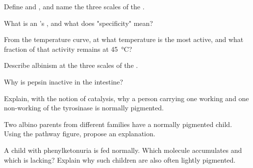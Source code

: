 \begin{exercise}[$\star$]\label{exo:g11:enzymes-and-phenotype:1}
Define  and , and name the three scales of the
.
\end{exercise}

\begin{exercise}[$\star$]\label{exo:g11:enzymes-and-phenotype:2}
What is an 's , and what does "specificity" mean?
\end{exercise}

\begin{exercise}[$\star$]\label{exo:g11:enzymes-and-phenotype:3}
From the temperature curve, at what temperature is the  most
active, and what fraction of that activity remains at
\qty{45}{\celsius}?
\end{exercise}

\begin{exercise}[$\star$]\label{exo:g11:enzymes-and-phenotype:4}
Describe albinism at the three scales of the .
\end{exercise}

\begin{exercise}[$\star$]\label{exo:g11:enzymes-and-phenotype:5}
Why is pepsin inactive in the intestine?
\end{exercise}

\begin{exercise}[$\star\star$]\label{exo:g11:enzymes-and-phenotype:6}
Explain, with the notion of catalysis, why a person carrying one
working and one non-working  of the tyrosinase  is normally
pigmented.
\end{exercise}

\begin{exercise}[$\star\star$]\label{exo:g11:enzymes-and-phenotype:7}
Two albino parents from different families have a normally pigmented
child. Using the pathway figure, propose an explanation.
\end{exercise}

\begin{exercise}[$\star\star$]\label{exo:g11:enzymes-and-phenotype:8}
A child with phenylketonuria is fed normally. Which molecule
accumulates and which is lacking? Explain why such children are also
often lightly pigmented.
\end{exercise}

